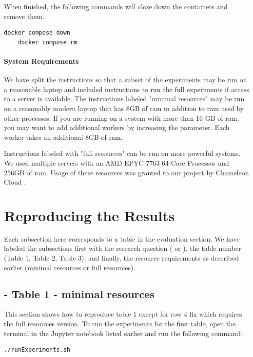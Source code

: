 \documentclass{article} %
\begin{document}
When finished, the following commands will close down the containers and remove them.

\begin{lstlisting}[language=bash]
    docker compose down
    docker compose rm
\end{lstlisting}

\paragraph{System Requirements} 
We have split the instructions so that a subset of the experiments may be run on a reasonable laptop and included instructions to run the full experiments if access to a server is available.
The instructions labeled "minimal resources" may be run on a reasonably modern laptop that has 8GB of ram in addition to ram used by other processes. If you are running on a system with more than 16 GB of ram, you may want to add additional workers by increasing the  parameter. Each worker takes an additional 8GB of ram.

Instructions labeled with "full resources" can be run on more powerful systems.  We used multiple servers with an AMD EPYC 7763 64-Core Processor and 256GB of ram.  Usage of these resources was granted to our project by Chameleon Cloud \cite{keahey2020lessons}.


\section{Reproducing the \toolname Results}

Each subsection here corresponds to a table in the evaluation section.  We have labeled the subsections first with the research question ( or ), the table number (Table 1, Table 2, Table 3), and finally, the resource requirements as described earlier (minimal resources or full resources).

\subsection{ - Table 1 - minimal resources}

This section shows how to reproduce table 1 except for row 4 fix which requires the full resources version.
To run the experiments for the first table, open the terminal in the Jupyter notebook listed earlier and run the following command:
\begin{lstlisting}[language=bash]
    ./runExperiments.sh
\end{lstlisting}
\end{document}
